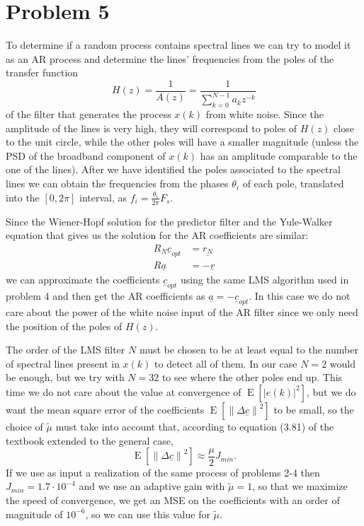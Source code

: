 \documentclass{article}
\renewcommand{\vec}[1]{\underline{#1}}
\newcommand{\E}[1]{\operatorname{E}\left[#1\right]}
\newcommand{\norm}[1]{\left\lVert#1\right\rVert}
\newcommand{\abs}[1]{\left|#1\right|}
\begin{document}
\section*{Problem 5}
To determine if a random process contains spectral lines we can try to
model it as an AR process and determine the lines' frequencies from
the poles of the transfer function
\[ H(z) = \frac{1}{A(z)} = \frac{1}{\sum_{k=0}^{N-1}a_kz^{-k}} \]
of the filter that generates the process $x(k)$ from white
noise. Since the amplitude of the lines is very high, they will
correspond to poles of $H(z)$ close to the unit circle, while the
other poles will have a smaller magnitude (unless the PSD of the
broadband component of $x(k)$ has an amplitude comparable to the one
of the lines). After we have identified the poles associated to the
spectral lines we can obtain the frequencies from the phases
$\theta_i$ of each pole, translated into the $[0,2\pi]$ interval, as
$f_i = \frac{\theta_i}{2\pi}F_s$.

Since the Wiener-Hopf solution for the predictor filter and the
Yule-Walker equation that gives us the solution for the AR coefficients
are similar:
\begin{align*}
  R_N\vec{c}_{opt} &= \vec{r_N} \\
  R\vec{a} &= -\vec{r}
\end{align*}
we can approximate the coefficients $\vec{c}_{opt}$ using the same LMS
algorithm used in problem 4 and then get the AR coefficients as $
\vec{a} = -\vec{c}_{opt}$. In this case we do not care about the power
of the white noise input of the AR filter since we only need the
position of the poles of $H(z)$.

The order of the LMS filter $N$ must be chosen to be at least equal to
the number of spectral lines present in $x(k)$ to detect all of
them. In our case $N=2$ would be enough, but we try with $N=32$ to see
where the other poles end up. This time we do not care about the value
at convergence of $\E{\abs{e(k)}^2}$, but we do want the mean square
error of the coefficients $ \E{\norm{\Delta\vec{c}}^2} $ to be small,
so the choice of $\tilde{\mu}$ must take into account that, according
to equation (3.81) of the textbook extended to the general case, 
\[ \E{\norm{\Delta\vec{c}}^2} \approx \frac{\mu}{2}J_{min} . \]
If we use as input a realization of the same process of problems 2-4
then $J_{min} = 1.7\cdot10^{-4}$ and we use an adaptive gain with
$\tilde{\mu} = 1$, so that we maximize the speed of convergence, we
get an MSE on the coefficients with an order of magnitude of $10^{-6}$,
so we can use this value for $\tilde{\mu}$.
\end{document}
